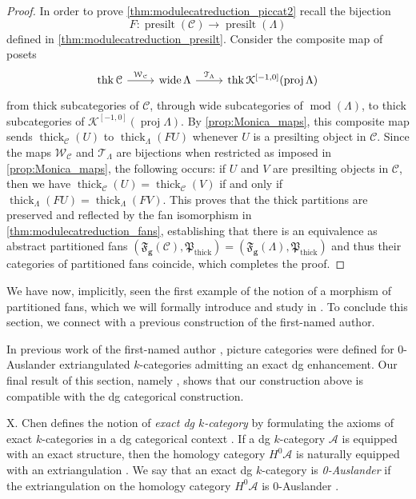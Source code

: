 \documentclass[10pt,twoside, a4paper,reqno]{amsart}
\DeclareMathOperator{\mods}{mod}
\DeclareMathOperator{\presilt}{presilt}
\DeclareMathOperator{\thick}{thick}
\DeclareMathOperator{\thicksubc}{thk}
\DeclareMathOperator{\proj}{proj}
\DeclareMathOperator{\wide}{wide}
\newcommand{\Ktwo}{\mathcal{K}^{[-1,0]}}
\newcommand{\partfan}[1]{\mathfrak{F}_{\bfg}(#1)}
\newcommand{\A}{\mathscr{A}}
\newcommand{\calC}{\mathcal{C}}
\newcommand{\calT}{\mathcal{T}}
\newcommand{\calW}{\mathcal{W}}
\newcommand{\bfg}{\mathbf{g}}
\theoremstyle{definition}
\begin{document}
\begin{proof}
    In order to prove \eqref{thm:modulecatreduction_piccat2} {recall the bijection} 
    \[ F\colon \presilt(\calC) \to \presilt( \Lambda) \]
    defined in \eqref{thm:modulecatreduction_presilt}. Consider the composite map of posets
    \begin{equation*}%
        \begin{tikzcd}
            \thicksubc{\calC} \arrow[r,"\calW_{\calC}"] & \wide \Lambda \arrow[r,"\calT_{\Lambda}"] & \thicksubc {\Ktwo(\proj{\Lambda})}
        \end{tikzcd}
    \end{equation*}
    from thick subcategories of $\calC$, through wide subcategories of $\mods(\Lambda)$, to thick subcategories of $\Ktwo(\proj{\Lambda})$.
    By \eqref{prop:Monica_maps},
    this composite map sends $\thick_{\calC}(U)$ to $\thick_{\Lambda}(FU)$ whenever $U$ is a presilting object in $\calC$. Since the maps $\calW_{\calC}$ and $\calT_{\Lambda}$ are bijections when restricted as imposed in \eqref{prop:Monica_maps}, the following occurs: if $U$ and $V$ are presilting objects in $\calC$, then we have $\thick_{\calC}(U)=\thick_{\calC}(V)$ if and only if $\thick_{\Lambda}(FU)=\thick_{\Lambda}(FV)$. This proves that the thick partitions are preserved and reflected by the fan isomorphism in \eqref{thm:modulecatreduction_fans}, establishing that there is an equivalence as abstract partitioned fans $(\partfan{\calC}, \mathfrak{P}_{\thick})=(\partfan{\Lambda}, \mathfrak{P}_{\thick})$ and thus their categories of partitioned fans coincide, which completes the proof.
\end{proof}

We have now, implicitly, seen the first example of the notion of a morphism of partitioned fans, which we will formally introduce and study in . To conclude this section, we connect  with a previous construction of the first-named author.

In previous work of the first-named author \cite[§6]{Bor24}, picture categories were defined for 0-Auslander extriangulated $k$-categories admitting an exact dg enhancement. Our final result of this section, namely , shows that our construction above is compatible with the dg categorical construction.

X. Chen defines the notion of \textit{exact dg $k$-category} by formulating the axioms of exact  $k$-categories in a dg categorical context \cite{Che23thesis,Che26}. If a dg $k$-category $\A$ is equipped with an exact structure, then the homology category $H^0\A$ is naturally equipped with an extriangulation \cite[{Thm.} 4.26]{Che24}. We say that an exact dg $k$-category is \textit{0-Auslander} if the extriangulation on the homology category $H^0\A$ is 0-Auslander \cite{Che23}.
\end{document}

